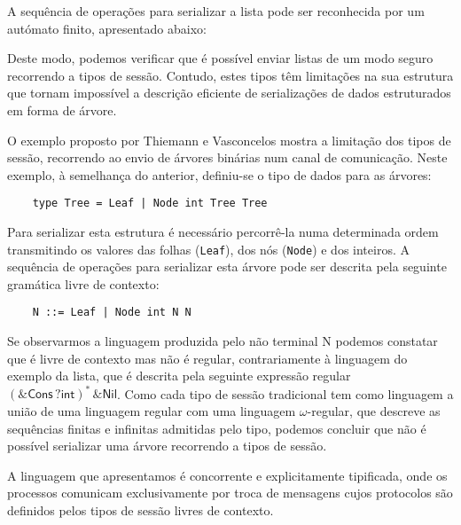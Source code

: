 A sequência de operações para serializar a lista pode ser reconhecida por um autómato finito, apresentado abaixo:



Deste modo, podemos verificar que é possível enviar listas de um modo seguro recorrendo a tipos de sessão. Contudo, estes tipos têm limitações na sua estrutura que tornam impossível a descrição eficiente de serializações de dados estruturados em forma de árvore.

O exemplo proposto por Thiemann e Vasconcelos \cite{ref-cfst}
mostra a limitação dos tipos de sessão, recorrendo ao envio de árvores binárias num canal de comunicação. Neste exemplo, à semelhança do anterior, definiu-se o tipo de dados para as árvores:
\begin{lstlisting}
	type Tree = Leaf | Node int Tree Tree
\end{lstlisting}
Para serializar esta estrutura é necessário percorrê-la numa determinada ordem transmitindo os valores das folhas (\lstinline"Leaf"), dos nós (\lstinline"Node") e dos inteiros. A sequência de operações para serializar esta árvore pode ser descrita pela seguinte gramática livre de contexto:
\begin{lstlisting}
	N ::= Leaf | Node int N N
\end{lstlisting}
Se observarmos a linguagem produzida pelo não terminal N podemos constatar que é livre de contexto mas não é regular, contrariamente à linguagem do exemplo da lista, que é descrita pela seguinte expressão regular $(\&\textsf{Cons}\,?\textsf{int})^{*}\,\&\textsf{Nil}$. Como cada tipo de sessão tradicional tem como linguagem a união de uma linguagem regular com uma linguagem $\omega$-regular, que descreve as sequências finitas e infinitas admitidas pelo tipo, podemos concluir que não é possível serializar uma árvore recorrendo a tipos de sessão.

A linguagem que apresentamos é concorrente e explicitamente tipificada, onde os processos comunicam exclusivamente por troca de mensagens cujos protocolos são definidos pelos tipos de sessão livres de contexto.


